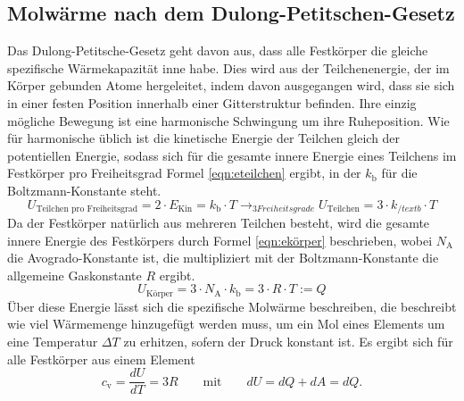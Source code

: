 \documentclass[titlepage = firstcover]{scrartcl}
\begin{document}
        \subsection{Molwärme nach dem Dulong-Petitschen-Gesetz}
            Das Dulong-Petitsche-Gesetz geht davon aus, dass alle Festkörper die gleiche spezifische Wärmekapazität inne habe. Dies wird aus der
            Teilchenenergie, der im Körper gebunden Atome hergeleitet, indem davon ausgegangen wird, dass sie sich in einer festen Position
            innerhalb einer Gitterstruktur befinden. Ihre einzig mögliche Bewegung ist eine harmonische Schwingung um ihre Ruheposition. Wie für
            harmonische üblich ist die kinetische Energie der Teilchen gleich der potentiellen Energie, sodass sich für die gesamte innere Energie eines 
            Teilchens im Festkörper pro Freiheitsgrad Formel \eqref{eqn:eteilchen} ergibt, in der $k_{\text{b}}$ für die Boltzmann-Konstante steht.
            \begin{equation}
                U_{\text{Teilchen pro Freiheitsgrad}} = 2 \cdot E_{\text{Kin}} = k_{\text{b}} \cdot T \longrightarrow_{3 Freiheitsgrade} U_{\text{Teilchen}} = 3 \cdot k_{/text{b}} \cdot T
                \label{eqn:eteilchen}
            \end{equation} 
            Da der Festkörper natürlich aus mehreren Teilchen besteht, wird die gesamte innere Energie des Festkörpers durch Formel \eqref{eqn:ekörper} beschrieben, 
            wobei $N_{\text{A}}$ die Avogrado-Konstante ist, die multipliziert mit der Boltzmann-Konstante die allgemeine Gaskonstante $R$ ergibt. 
            \begin{equation}
                U_{\text{Körper}} = 3 \cdot N_{\text{A}} \cdot k_{\text{b}} = 3 \cdot R \cdot T := Q
                \label{eqn:ekörper}
            \end{equation}
            Über diese Energie lässt sich die spezifische Molwärme beschreiben, die beschreibt wie viel Wärmemenge hinzugefügt werden muss, um ein Mol eines
            Elements um eine Temperatur $\Delta T$ zu erhitzen, sofern der Druck konstant ist. Es ergibt sich für alle Festkörper aus einem Element
            \begin{equation}
                c_{\text{v}} = \frac{dU}{dT} = 3R \qquad \text{mit} \qquad dU = dQ + dA = dQ .
            \end{equation}
          
\end{document}

